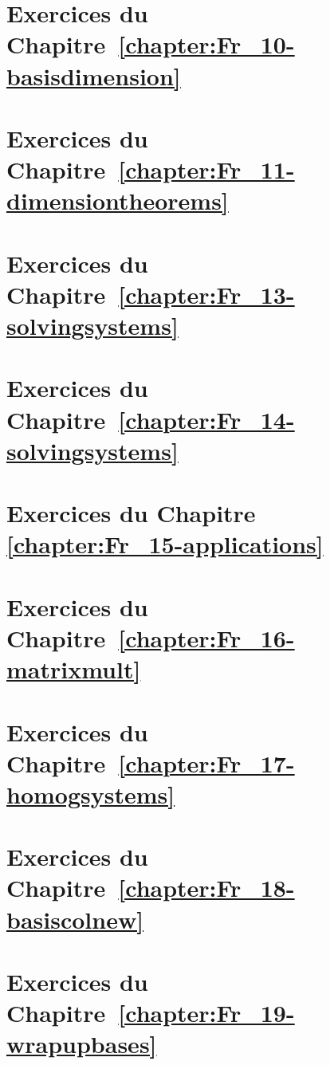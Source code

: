 \section*{Exercices du Chapitre~\ref{chapter:Fr_10-basisdimension}}



\section*{Exercices du Chapitre~\ref{chapter:Fr_11-dimensiontheorems}}


\section*{Exercices du Chapitre~\ref{chapter:Fr_13-solvingsystems}}
 

\section*{Exercices du Chapitre~\ref{chapter:Fr_14-solvingsystems}} 





\section*{Exercices du Chapitre~ \ref{chapter:Fr_15-applications}}



\section*{Exercices du Chapitre~\ref{chapter:Fr_16-matrixmult}}  


\section*{Exercices du Chapitre~\ref{chapter:Fr_17-homogsystems}}  



\section*{Exercices du Chapitre~\ref{chapter:Fr_18-basiscolnew}} 
 

\section*{Exercices du Chapitre~\ref{chapter:Fr_19-wrapupbases}}  


